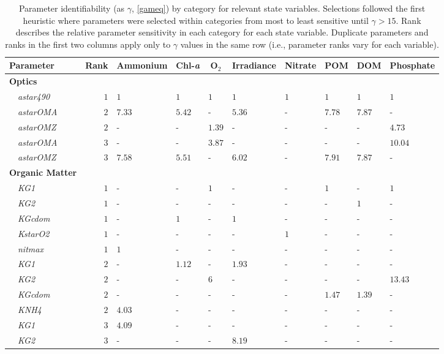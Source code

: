\documentclass[preprint]{elsarticle}\usepackage[]{graphicx}\usepackage[]{color}
\begin{document}
\begin{table}[!tbp]
{\scriptsize
\caption{Parameter identifiability (as $\gamma$, \cref{gameq}) by category for relevant state variables.  Selections followed the first heuristic where parameters were selected within categories from most to least sensitive until $\gamma > 15$.  Rank describes the relative parameter sensitivity in each category for each state variable. Duplicate parameters and ranks in the first two columns apply only to $\gamma$ values in the same row (i.e., parameter ranks vary for each variable).\label{tab:heurist1}} 
\begin{center}
\begin{tabular}{lrllllllll}
\hline\hline
\multicolumn{1}{l}{Parameter}&\multicolumn{1}{c}{Rank}&\multicolumn{1}{c}{Ammonium}&\multicolumn{1}{c}{Chl-\textit{a}}&\multicolumn{1}{c}{O$_2$}&\multicolumn{1}{c}{Irradiance}&\multicolumn{1}{c}{Nitrate}&\multicolumn{1}{c}{POM}&\multicolumn{1}{c}{DOM}&\multicolumn{1}{c}{Phosphate}\tabularnewline
\hline
{\bfseries Optics}&&&&&&&&&\tabularnewline
~~\scriptsize{\textit{astar490}}&$1$&$1$&$1$&$1$&$1$&$1$&$1$&$1$&$1$\tabularnewline
~~\scriptsize{\textit{astarOMA}}&$2$&$7.33$&$5.42$&-&$5.36$&-&$7.78$&$7.87$&-\tabularnewline
~~\scriptsize{\textit{astarOMZ}}&$2$&-&-&$1.39$&-&-&-&-&$4.73$\tabularnewline
~~\scriptsize{\textit{astarOMA}}&$3$&-&-&$3.87$&-&-&-&-&$10.04$\tabularnewline
~~\scriptsize{\textit{astarOMZ}}&$3$&$7.58$&$5.51$&-&$6.02$&-&$7.91$&$7.87$&-\tabularnewline
\hline
{\bfseries Organic Matter}&&&&&&&&&\tabularnewline
~~\scriptsize{\textit{KG1}}&$1$&-&-&$1$&-&-&$1$&-&$1$\tabularnewline
~~\scriptsize{\textit{KG2}}&$1$&-&-&-&-&-&-&$1$&-\tabularnewline
~~\scriptsize{\textit{KGcdom}}&$1$&-&$1$&-&$1$&-&-&-&-\tabularnewline
~~\scriptsize{\textit{KstarO2}}&$1$&-&-&-&-&$1$&-&-&-\tabularnewline
~~\scriptsize{\textit{nitmax}}&$1$&$1$&-&-&-&-&-&-&-\tabularnewline
~~\scriptsize{\textit{KG1}}&$2$&-&$1.12$&-&$1.93$&-&-&-&-\tabularnewline
~~\scriptsize{\textit{KG2}}&$2$&-&-&$6$&-&-&-&-&$13.43$\tabularnewline
~~\scriptsize{\textit{KGcdom}}&$2$&-&-&-&-&-&$1.47$&$1.39$&-\tabularnewline
~~\scriptsize{\textit{KNH4}}&$2$&$4.03$&-&-&-&-&-&-&-\tabularnewline
~~\scriptsize{\textit{KG1}}&$3$&$4.09$&-&-&-&-&-&-&-\tabularnewline
~~\scriptsize{\textit{KG2}}&$3$&-&-&-&$8.19$&-&-&-&-\tabularnewline

\end{tabular}
\end{center}}
\end{table}
\end{document}
